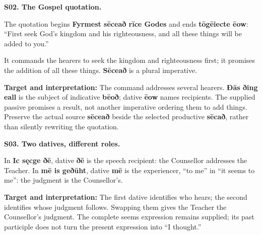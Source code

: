 \par\begin{minipage}{\linewidth}\raggedright
\textbf{S02. The Gospel quotation.}

The quotation begins \textbf{Fyrmest sēceað rīce Godes} and ends \textbf{tōgēiecte ēow}: “First seek God's kingdom and his righteousness, and all these things will be added to you.”

It commands the hearers to seek the kingdom and righteousness first; it promises the addition of all these things. \textbf{Sēceað} is a plural imperative.

\textbf{Target and interpretation:} The command addresses several hearers. \textbf{Ðās ðing eall} is the subject of indicative \textbf{bēoð}; dative \textbf{ēow} names recipients. The supplied passive promises a result, not another imperative ordering them to add things. Preserve the actual source \textbf{sēceað} beside the selected productive \textbf{sēcað}, rather than silently rewriting the quotation.

\end{minipage}\par\addvspace{4pt}

\par\begin{minipage}{\linewidth}\raggedright
\textbf{S03. Two datives, different roles.}

In \textbf{Ic sęcge ðē}, dative \textbf{ðē} is the speech recipient: the Counsellor addresses the Teacher. In \textbf{mē is geðūht}, dative \textbf{mē} is the experiencer, “to me” in “it seems to me”: the judgment is the Counsellor's.

\textbf{Target and interpretation:} The first dative identifies who hears; the second identifies whose judgment follows. Swapping them gives the Teacher the Counsellor's judgment. The complete seems expression remains supplied; its past participle does not turn the present expression into “I thought.”

\end{minipage}\par\addvspace{4pt}

